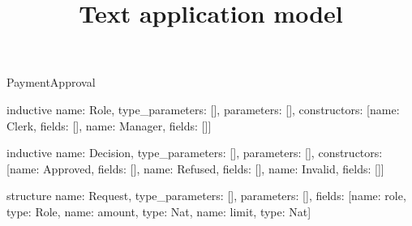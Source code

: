 \begin{lexlean}{PaymentApproval}
\title{Text application model}
\begin{semanticmodule}
inductive{
  name: Role,
  type_parameters: [],
  parameters: [],
  constructors: [{name: Clerk, fields: []}, {name: Manager, fields: []}]
}

inductive{
  name: Decision,
  type_parameters: [],
  parameters: [],
  constructors: [{name: Approved, fields: []}, {name: Refused, fields: []}, {name: Invalid, fields: []}]
}

structure{
  name: Request,
  type_parameters: [],
  parameters: [],
  fields: [{name: role, type: Role}, {name: amount, type: Nat}, {name: limit, type: Nat}]
}


\end{semanticmodule}
\end{lexlean}
